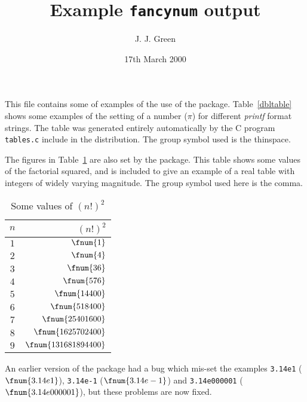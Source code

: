 \documentclass[a4paper]{article}
\title{Example \texttt{fancynum} output}
\date{17th March 2000}
\author{J. J. Green}
\begin{document}
\maketitle

This file contains some of examples of the use of the package.
Table~\ref{dbltable} shows some examples of the setting
of a number ($\pi$) for different \emph{printf} format strings.
The table was generated entirely automatically by the C program
\texttt{tables.c} include in the distribution. The group symbol used is
the thinspace.
\setfnumgsym{\,}


The figures in Table~\ref{factorial} are also set by the package.
This table shows some values of the factorial squared, and is 
included to give an example of a real table with integers of 
widely varying magnitude. The group symbol used here is the comma.
\begin{table}[tbh]
\begin{center}
\setfnumgsym{{,}}
\begin{tabular}{|c|r|}
\hline
$n$ & $(n!)^2$ \\ 
\hline
$1$ & $\fnum{1}$ \\
$2$ & $\fnum{4}$ \\
$3$ & $\fnum{36}$ \\
$4$ & $\fnum{576}$ \\
$5$ & $\fnum{14400}$ \\
$6$ & $\fnum{518400}$ \\
$7$ & $\fnum{25401600}$ \\
$8$ & $\fnum{1625702400}$ \\
$9$ & $\fnum{131681894400}$ \\
\hline
\end{tabular}
\end{center}
\caption{Some values of $(n!)^2$\label{factorial}}
\end{table}

\newcommand{\fntest}[1]{\texttt{#1} ($\fnum{#1}$)\xspace}
An earlier version of the package had a bug which
mis-set the examples \fntest{3.14e1}, \fntest{3.14e-1}
and \fntest{3.14e000001}, but these problems are now
fixed.
\end{document}
